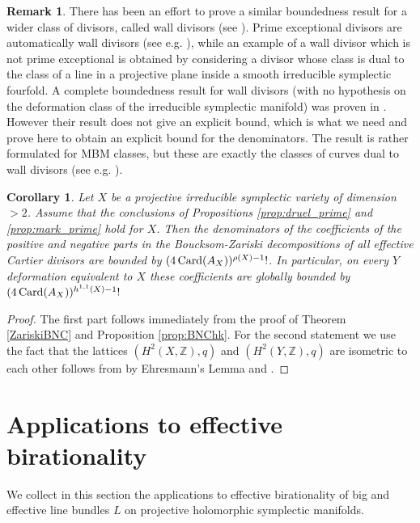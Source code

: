 \documentclass[12pt,reqno]{amsart}
\def\card{\mathop{\rm Card}\nolimits}
\theoremstyle{plain}
\newtheorem{corollary}[thm]{Corollary}
\theoremstyle{definition}
\newtheorem{remark}[thm]{Remark}
\begin{document}
\begin{remark} 
There has been an effort to prove a similar boundedness result for a wider class of divisors, called wall divisors
(see \cite[Definition 1.2]{Mon}). Prime exceptional divisors are automatically wall divisors (see e.g. \cite[Lemma 1.4]{Mon}), while an example of a wall divisor which is not prime exceptional is  obtained by considering a divisor whose class is dual to the class of a line in a projective plane inside a smooth irreducible symplectic fourfold. A complete boundedness result for wall divisors (with no hypothesis on the deformation class of the irreducible symplectic manifold) was proven in \cite{amver_last}. However their result does not give an explicit bound, which is what we need and prove here to obtain an explicit bound for the denominators. The result is rather formulated for MBM classes, but these are  exactly the classes of curves dual to wall divisors (see e.g. \cite[Remark 2.4]{TAMS}).
\end{remark}

\begin{corollary} \label{corofZariskiBNC} Let $X$ be a projective irreducible symplectic variety of dimension $>2$. Assume that the conclusions of Propositions \ref{prop:druel_prime} and \ref{prop:mark_prime} hold for $X$. Then the denominators of the coefficients of the positive and negative parts in the Boucksom-Zariski decompositions of all effective Cartier divisors are  bounded by $(4\card(A_X))^{\rho(X)-1}!$. In particular, on every $Y$ deformation equivalent to $X$ these coefficients are globally bounded by $(4\card(A_X))^{h^{1,1}(X)-1}!$
\end{corollary}
\begin{proof}
The first part follows immediately from the proof of Theorem \ref{ZariskiBNC} and Proposition \ref{prop:BNChk}. For the second statement we use the fact that the lattices $(H^2(X,\mathbb{Z}), q)$ and $(H^2(Y,\mathbb{Z}), q)$ are isometric to each other follows from by Ehresmann's Lemma and \cite{Beau84}.
\end{proof}


\section{Applications to effective birationality}

We collect in this section the applications to effective birationality of big and effective line bundles $L$ on projective holomorphic symplectic manifolds. 
\end{document}
